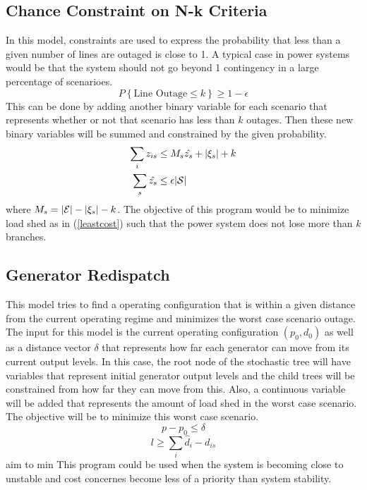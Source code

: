 \subsection{Chance Constraint on N-k Criteria}
In this model, constraints are used to express the probability that less than a given number of lines are outaged is close to 1.  A typical case in power systems would be that the system should not go beyond 1 contingency in a large percentage of scenarioes.
\begin{equation}
P\left\{\text{Line Outage} \le k \right\} \ge 1 - \epsilon
\end{equation}
This can be done by adding another binary variable for each scenario that represents whether or not that scenario has less than $k$ outages.  Then these new binary variables will be summed and constrained by the given probability.
\begin{subequations}
\begin{align}
\sum_i z_{is} &\le	M_s \hat{z_s} + | \xi_s | + k \\
\sum_s \hat{z_s} &\le \epsilon | \mathcal{S} |
\end{align}
\end{subequations}
where $M_s = | \mathcal{E} | - | \xi_s | - k$.  The objective of this program would be to minimize load shed as in (\ref{leastcost}) such that the power system does not lose more than $k$ branches.
\subsection{Generator Redispatch}
This model tries to find a operating configuration that is within a given distance from the current operating regime and minimizes the worst case scenario outage.  The input for this model is the current operating configuration $(p_0, d_0)$ as well as a distance vector $\delta$ that represents how far each generator can move from its current output levels.  In this case, the root node of the stochastic tree will have variables that represent initial generator output levels and the child trees will be constrained from how far they can move from this.  Also, a continuous variable will be added that represents the amount of load shed in the worst case scenario.  The objective will be to minimize this worst case scenario.  
\begin{equation}
p - p_0 \le \delta
\end{equation}
\begin{equation}
l \ge \sum_i \hat{d}_i - d_{is}
\end{equation}
aim to min 
This program could be used when the system is becoming close to unstable and cost concernes become less of a priority than system stability.


